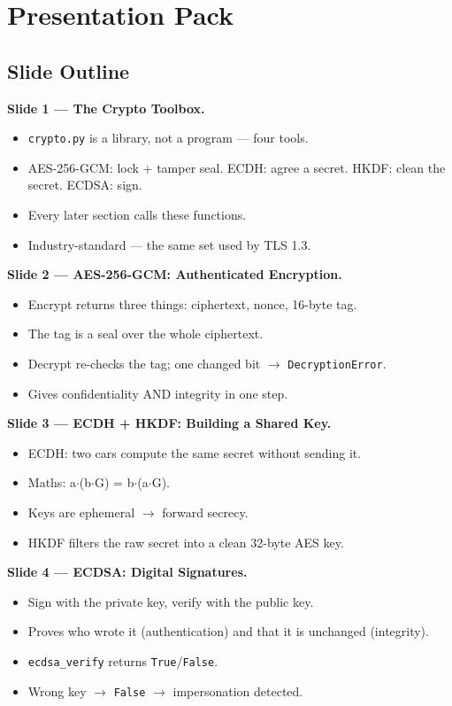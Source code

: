 \documentclass[11pt,a4paper]{article}
\begin{document}
\section{Presentation Pack}

\subsection{Slide Outline}

\textbf{Slide 1 --- The Crypto Toolbox.}
\begin{itemize}
  \item \texttt{crypto.py} is a library, not a program --- four tools.
  \item AES-256-GCM: lock + tamper seal. ECDH: agree a secret. HKDF: clean the
        secret. ECDSA: sign.
  \item Every later section calls these functions.
  \item Industry-standard --- the same set used by TLS 1.3.
\end{itemize}

\textbf{Slide 2 --- AES-256-GCM: Authenticated Encryption.}
\begin{itemize}
  \item Encrypt returns three things: ciphertext, nonce, 16-byte tag.
  \item The tag is a seal over the whole ciphertext.
  \item Decrypt re-checks the tag; one changed bit $\to$ \texttt{DecryptionError}.
  \item Gives confidentiality AND integrity in one step.
\end{itemize}

\textbf{Slide 3 --- ECDH + HKDF: Building a Shared Key.}
\begin{itemize}
  \item ECDH: two cars compute the same secret without sending it.
  \item Maths: a$\cdot$(b$\cdot$G) = b$\cdot$(a$\cdot$G).
  \item Keys are ephemeral $\to$ forward secrecy.
  \item HKDF filters the raw secret into a clean 32-byte AES key.
\end{itemize}

\textbf{Slide 4 --- ECDSA: Digital Signatures.}
\begin{itemize}
  \item Sign with the private key, verify with the public key.
  \item Proves who wrote it (authentication) and that it is unchanged (integrity).
  \item \texttt{ecdsa\_verify} returns \texttt{True}/\texttt{False}.
  \item Wrong key $\to$ \texttt{False} $\to$ impersonation detected.
\end{itemize}
\end{document}
